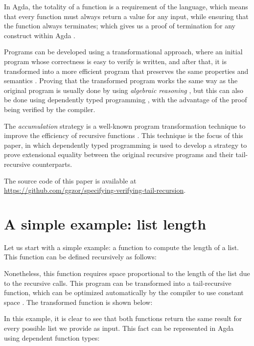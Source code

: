\documentclass{cys}
\begin{document}
In Agda, the totality of a function is a requirement of the language, which means that
every function must always return a value for any input, while ensuring that the function
always terminates; which gives us a proof of termination for any construct within Agda
\cite{bove2009brief}.

Programs can be developed using a transformational approach, where an initial program
whose correctness is easy to verify is written, and after that, it is transformed into a
more efficient program that preserves the same properties and semantics
\cite{pettorossi1993rules}. Proving that the transformed program works the same way as
the original program is usually done by using \emph{algebraic reasoning}
\cite{bird1996algebra}, but this can also be done using dependently typed programming
\cite{mu2008algebra}, with the advantage of the proof being verified by the compiler.

The \emph{accumulation} strategy is a well-known program transformation technique to
improve the efficiency of recursive functions \cite{bird1984promotion}. This technique is
the focus of this paper, in which dependently typed programming is used to develop a
strategy to prove extensional equality between the original recursive programs and their
tail-recursive counterparts.

The source code of this paper is available at
\url{https://github.com/ggzor/specifying-verifying-tail-recursion}.

\section{A simple example: list length}

Let us start with a simple example: a function to compute the length of a list. This
function can be defined recursively as follows:


Nonetheless, this function requires space proportional to the length of the list due to
the recursive calls. This program can be transformed into a tail-recursive function,
which can be optimized automatically by the compiler to use constant space
\cite{bauer2003compilation}. The transformed function is shown below:


In this example, it is clear to see that both functions return the same result for every
possible list we provide as input. This fact can be represented in Agda using dependent
function types:
\end{document}
